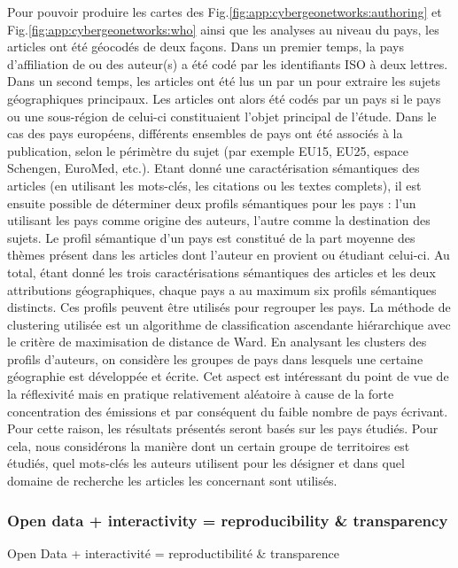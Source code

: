 {Pour pouvoir produire les cartes des Fig.\ref{fig:app:cybergeonetworks:authoring} et Fig.\ref{fig:app:cybergeonetworks:who} ainsi que les analyses au niveau du pays, les articles ont été géocodés de deux façons. Dans un premier temps, la pays d'affiliation de ou des auteur(s) a été codé par les identifiants ISO à deux lettres. Dans un second temps, les articles ont été lus un par un pour extraire les sujets géographiques principaux. Les articles ont alors été codés par un pays si le pays ou une sous-région de celui-ci constituaient l'objet principal de l'étude. Dans le cas des pays européens, différents ensembles de pays ont été associés à la publication, selon le périmètre du sujet (par exemple EU15, EU25, espace Schengen, EuroMed, etc.). Etant donné une caractérisation sémantiques des articles (en utilisant les mots-clés, les citations ou les textes complets), il est ensuite possible de déterminer deux profils sémantiques pour les pays : l'un utilisant les pays comme origine des auteurs, l'autre comme la destination des sujets. Le profil sémantique d'un pays est constitué de la part moyenne des thèmes présent dans les articles dont l'auteur en provient ou étudiant celui-ci. Au total, étant donné les trois caractérisations sémantiques des articles et les deux attributions géographiques, chaque pays a au maximum six profils sémantiques distincts. Ces profils peuvent être utilisés pour regrouper les pays. La méthode de clustering utilisée est un algorithme de classification ascendante hiérarchique avec le critère de maximisation de distance de Ward. En analysant les clusters des profils d'auteurs, on considère les groupes de pays dans lesquels une certaine géographie est développée et écrite. Cet aspect est intéressant du point de vue de la réflexivité mais en pratique relativement aléatoire à cause de la forte concentration des émissions et par conséquent du faible nombre de pays écrivant. Pour cette raison, les résultats présentés seront basés sur les pays étudiés. Pour cela, nous considérons la manière dont un certain groupe de territoires est étudiés, quel mots-clés les auteurs utilisent pour les désigner et dans quel domaine de recherche les articles les concernant sont utilisés.
}



\subsubsection{Open data + interactivity = reproducibility \& transparency}{Open Data + interactivité = reproductibilité \& transparence}


